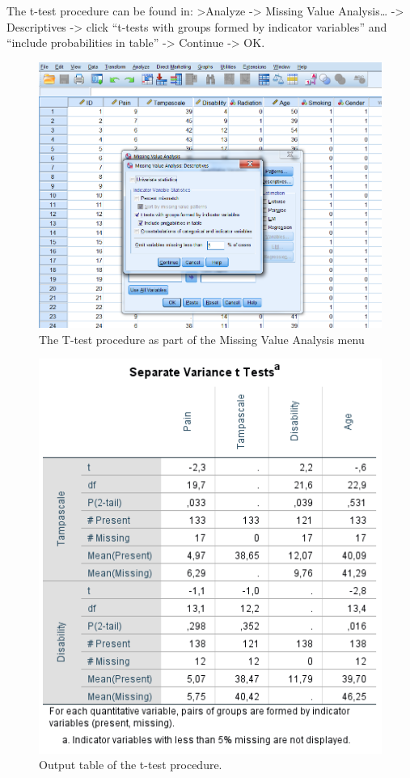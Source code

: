 \documentclass[]{book}
\theoremstyle{definition}
\theoremstyle{definition}
\theoremstyle{definition}
\theoremstyle{remark}
\begin{document}
The t-test procedure can be found in: \textgreater{}Analyze
-\textgreater{} Missing Value Analysis\ldots{} -\textgreater{}
Descriptives -\textgreater{} click ``t-tests with groups formed by
indicator variables'' and ``include probabilities in table''
-\textgreater{} Continue -\textgreater{} OK.

\begin{figure}

{\centering \includegraphics[width=0.9\linewidth]{images/fig2.11} 

}

\caption{The T-test procedure as part of the Missing Value Analysis menu}\label{fig:fig2-11}
\end{figure}

\begin{figure}

{\centering \includegraphics[width=0.9\linewidth]{images/tab2.5} 

}

\caption{Output table of the t-test procedure.}\label{fig:tab2-5}
\end{figure}
\end{document}
